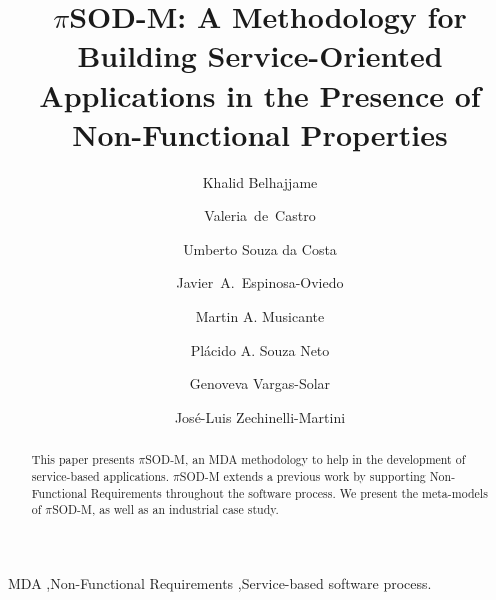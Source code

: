 \documentclass[preprint,12pt]{elsarticle}
\theoremstyle{plain}
\theoremstyle{plain}
\theoremstyle{plain}
\theoremstyle{plain}
\newcommand{\pisodm}[0]{$\pi$SOD-M\xspace}
\begin{document}
\begin{frontmatter}



\title{\pisodm: A Methodology for Building Service-Oriented Applications in
the Presence of Non-Functional Properties}



\author[inst1]{Khalid Belhajjame}
\author[inst2]{Valeria~de~Castro}
\author[inst3]{Umberto Souza da Costa}
\author[inst4]{Javier~A.~Espinosa-Oviedo}
\author[inst3]{Martin A. Musicante}
\author[inst5]{Pl\'acido A. Souza Neto}
\author[inst6,inst4]{Genoveva Vargas-Solar}
\author[inst4]{Jos\'e-Luis Zechinelli-Martini}


\address[inst1]{Universit\'e de Paris - Dauphine -- Paris, France}
\address[inst2]{Universidad Rey Juan Carlos -- M\'{o}stoles, Spain}
\address[inst3]{Universidade Federal do Rio Grande do Norte -- Natal, Brazil}
\address[inst4]{Universidad de las Am\'ericas-Puebla, LAFMIA -- Cholula, Mexico}
\address[inst5]{Instituto Federal de Educa\c{c}\~{a}o, Ci\^{e}ncia e Tecnologia do Rio Grande do Norte -- Natal, Brazil}
\address[inst6]{CNRS, LIG-LAFMIA, Saint Martin d'H\`eres, France}


\begin{abstract}
This paper presents \pisodm, an MDA methodology to help in the development of service-based applications.
\pisodm extends a previous work by supporting Non-Functional Requirements throughout the software process.
We present the meta-models of \pisodm, as well as an industrial case study.
\end{abstract}

\begin{keyword}
MDA \sep Non-Functional Requirements \sep Service-based software process.


\end{keyword}

\end{frontmatter}
\end{document}
